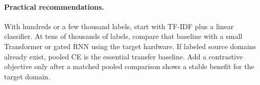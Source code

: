 \paragraph{Practical recommendations.}
With hundreds or a few thousand labels, start with TF-IDF plus a linear classifier. At tens of thousands of labels, compare that baseline with a small Transformer or gated RNN using the target hardware. If labeled source domains already exist, pooled CE is the essential transfer baseline. Add a contrastive objective only after a matched pooled comparison shows a stable benefit for the target domain.
